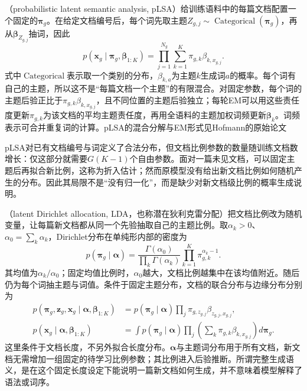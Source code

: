 （probabilistic latent semantic analysis, pLSA）给训练语料中的每篇文档配置一个固定的$\bm{\pi}_g$。在给定文档编号后，每个词先取主题$Z_{g,j}\sim\operatorname{Categorical}(\bm{\pi}_g)$，再从$\bm{\beta}_{Z_{g,j}}$抽词，因此
\begin{equation}
  \label{eq:pgm-static-directed-plsa}
  p(\bm{x}_g\mid\bm{\pi}_g,\bm{\beta}_{1:K})
    =\prod_{j=1}^{N_g}
       \sum_{k=1}^{K}\pi_{g,k}\beta_{k,x_{g,j}}.
\end{equation}
式中$\operatorname{Categorical}$表示取一个类别的分布，$\beta_{k,a}$为主题$k$生成词$a$的概率。每个词有自己的主题，所以这不是“每篇文档一个主题”的有限混合。对固定参数，每个词的主题后验正比于$\pi_{g,k}\beta_{k,x_{g,j}}$，且不同位置的主题后验独立；每轮EM可以用这些责任度更新$\pi_{g,k}$为该文档的平均主题责任度，再用全语料的主题加权词频更新$\bm{\beta}_k$。词频表示可合并重复词的计算。pLSA的混合分解与EM形式见Hofmann的原始论文

pLSA对已有文档编号与词定义了合法分布，但文档比例参数的数量随训练文档数增长：仅这部分就需要$G(K-1)$个自由参数。面对一篇未见文档，可以固定主题后再拟合新比例，这称为折入估计；然而原模型没有给出新文档比例如何随机产生的分布。因此其局限不是“没有归一化”，而是缺少对新文档级比例的概率生成说明。

（latent Dirichlet allocation, LDA，也称潜在狄利克雷分配）把文档比例改为随机变量，让每篇新文档都从同一个先验抽取自己的主题比例。取$\alpha_k>0$、$\alpha_0=\sum_k\alpha_k$，Dirichlet分布在单纯形内部的密度为
\[
  p(\bm{\pi}_g\mid\bm{\alpha})
    =\frac{\Gamma(\alpha_0)}{\prod_k\Gamma(\alpha_k)}
      \prod_{k=1}^{K}\pi_{g,k}^{\alpha_k-1}.
\]
其均值为$\alpha_k/\alpha_0$；固定均值比例时，$\alpha_0$越大，文档比例越集中在该均值附近。随后仍为每个词抽主题与词值。条件于固定主题分布，文档的联合分布与边缘分布分别为
\begin{equation}
  \label{eq:pgm-static-directed-lda}
  \begin{aligned}
    p(\bm{\pi}_g,\bm{z}_g,\bm{x}_g\mid
          \bm{\alpha},\bm{\beta}_{1:K})
      &=p(\bm{\pi}_g\mid\bm{\alpha})
         \prod_j\pi_{g,z_{g,j}}\beta_{z_{g,j},x_{g,j}},\\
    p(\bm{x}_g\mid\bm{\alpha},\bm{\beta}_{1:K})
      &=\int p(\bm{\pi}_g\mid\bm{\alpha})
          \prod_j\left(\sum_k
              \pi_{g,k}\beta_{k,x_{g,j}}\right)d\bm{\pi}_g.
  \end{aligned}
\end{equation}
这里条件于文档长度，不另外拟合长度分布。$\bm{\alpha}$与主题词分布用于所有文档，新文档无需增加一组固定的待学习比例参数；其比例进入后验推断。所谓完整生成语义，是在这个固定长度设定下能说明一篇新文档如何生成，并不意味着模型解释了语法或词序。

